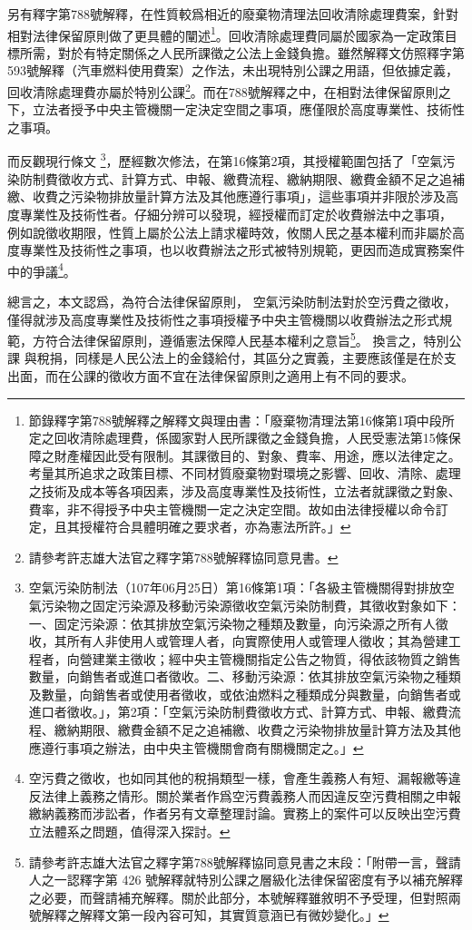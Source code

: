 \documentclass[12pt,a4paper]{article}
\begin{document}
另有釋字第788號解釋，在性質較爲相近的廢棄物清理法回收清除處理費案，針對相對法律保留原則做了更具體的闡述\footnote{節錄釋字第788號解釋之解釋文與理由書：「廢棄物清理法第16條第1項中段所定之回收清除處理費，係國家對人民所課徵之金錢負擔，人民受憲法第15條保障之財產權因此受有限制。其課徵目的、對象、費率、用途，應以法律定之。考量其所追求之政策目標、不同材質廢棄物對環境之影響、回收、清除、處理之技術及成本等各項因素，涉及高度專業性及技術性，立法者就課徵之對象、費率，非不得授予中央主管機關一定之決定空間。故如由法律授權以命令訂定，且其授權符合具體明確之要求者，亦為憲法所許。」}。回收清除處理費同屬於國家為一定政策目標所需，對於有特定關係之人民所課徵之公法上金錢負擔。雖然解釋文仿照釋字第593號解釋（汽車燃料使用費案）之作法，未出現特別公課之用語，但依據定義，回收清除處理費亦屬於特別公課\footnote{請參考許志雄大法官之釋字第788號解釋協同意見書。}。而在788號解釋之中，在相對法律保留原則之下，立法者授予中央主管機關一定決定空間之事項，應僅限於高度專業性、技術性之事項。

而反觀現行條文
\footnote{空氣污染防制法（107年06月25日）第16條第1項：「各級主管機關得對排放空氣污染物之固定污染源及移動污染源徵收空氣污染防制費，其徵收對象如下：一、固定污染源：依其排放空氣污染物之種類及數量，向污染源之所有人徵收，其所有人非使用人或管理人者，向實際使用人或管理人徵收；其為營建工程者，向營建業主徵收；經中央主管機關指定公告之物質，得依該物質之銷售數量，向銷售者或進口者徵收。二、移動污染源：依其排放空氣污染物之種類及數量，向銷售者或使用者徵收，或依油燃料之種類成分與數量，向銷售者或進口者徵收。」，第2項：「空氣污染防制費徵收方式、計算方式、申報、繳費流程、繳納期限、繳費金額不足之追補繳、收費之污染物排放量計算方法及其他應遵行事項之辦法，由中央主管機關會商有關機關定之。」}，歷經數次修法，在第16條第2項，其授權範圍包括了「空氣污染防制費徵收方式、計算方式、申報、繳費流程、繳納期限、繳費金額不足之追補繳、收費之污染物排放量計算方法及其他應遵行事項」，這些事項并非限於涉及高度專業性及技術性者。仔細分辨可以發現，經授權而訂定於收費辦法中之事項，
例如說徵收期限，性質上屬於公法上請求權時效，攸關人民之基本權利而非屬於高度專業性及技術性之事項，也以收費辦法之形式被特別規範，更因而造成實務案件中的爭議\footnote{空污費之徵收，也如同其他的稅捐類型一樣，會產生義務人有短、漏報繳等違反法律上義務之情形。關於業者作爲空污費義務人而因違反空污費相關之申報繳納義務而涉訟者，作者另有文章整理討論。實務上的案件可以反映出空污費立法體系之問題，值得深入探討。}。


總言之，本文認爲，為符合法律保留原則，
空氣污染防制法對於空污費之徵收，僅得就涉及高度專業性及技術性之事項授權予中央主管機關以收費辦法之形式規範，方符合法律保留原則，遵循憲法保障人民基本權利之意旨\footnote{請參考許志雄大法官之釋字第788號解釋協同意見書之末段：「附帶一言，聲請人之一認釋字第 426 號解釋就特別公課之層級化法律保留密度有予以補充解釋之必要，而聲請補充解釋。關於此部分，本號解釋雖敘明不予受理，但對照兩號解釋之解釋文第一段內容可知，其實質意涵已有微妙變化。」}。
換言之，特別公課 與稅捐，同樣是人民公法上的金錢給付，其區分之實義，主要應該僅是在於支出面，而在公課的徵收方面不宜在法律保留原則之適用上有不同的要求。
\end{document}
